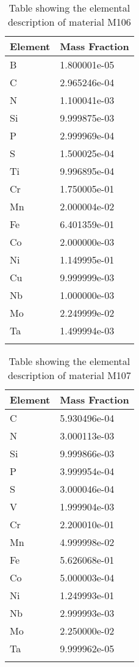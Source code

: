 \begin{centering}
\clearpage
\begin{longtable}[ht!]
{ p{} | p{} }
\hline
Element & Mass Fraction\\
\hline
B &  1.800001e-05\\
C &  2.965246e-04\\
N &  1.100041e-03\\
Si &  9.999875e-03\\
P &  2.999969e-04\\
S &  1.500025e-04\\
Ti &  9.996895e-04\\
Cr &  1.750005e-01\\
Mn &  2.000004e-02\\
Fe &  6.401359e-01\\
Co &  2.000000e-03\\
Ni &  1.149995e-01\\
Cu &  9.999999e-03\\
Nb &  1.000000e-03\\
Mo &  2.249999e-02\\
Ta &  1.499994e-03\\
\caption{Table showing the elemental description of material M106}
\label{table:material_M106}
\end{longtable}
\clearpage

\begin{longtable}[ht!]
{ p{} | p{} }
\hline
Element & Mass Fraction\\
\hline
C &  5.930496e-04\\
N &  3.000113e-03\\
Si &  9.999866e-03\\
P &  3.999954e-04\\
S &  3.000046e-04\\
V &  1.999904e-03\\
Cr &  2.200010e-01\\
Mn &  4.999998e-02\\
Fe &  5.626068e-01\\
Co &  5.000003e-04\\
Ni &  1.249993e-01\\
Nb &  2.999993e-03\\
Mo &  2.250000e-02\\
Ta &  9.999962e-05\\

\caption{Table showing the elemental description of material M107}
\label{table:material_M107}
\end{longtable}
\clearpage


\end{centering}
